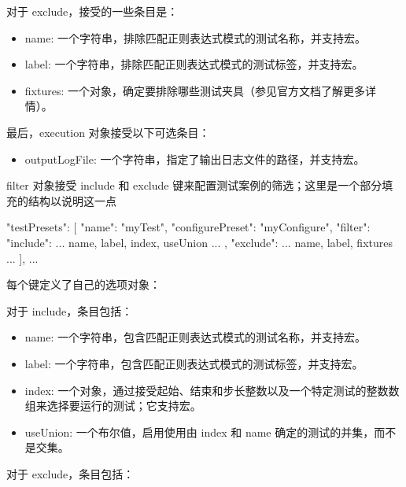 对于 exclude，接受的一些条目是：

\begin{itemize}
\item
name: 一个字符串，排除匹配正则表达式模式的测试名称，并支持宏。

\item
label:  一个字符串，排除匹配正则表达式模式的测试标签，并支持宏。

\item
fixtures: 一个对象，确定要排除哪些测试夹具（参见官方文档了解更多详情）。
\end{itemize}

最后，execution 对象接受以下可选条目：

\begin{itemize}
\item
outputLogFile: 一个字符串，指定了输出日志文件的路径，并支持宏。
\end{itemize}

filter 对象接受 include 和 exclude 键来配置测试案例的筛选；这里是一个部分填充的结构以说明这一点

\begin{json}
    "testPresets": [
        {
            "name": "myTest",
            "configurePreset": "myConfigure",
            "filter": {
                "include": {
                    ... name, label, index, useUnion ...
                },
                "exclude": {
                    ... name, label, fixtures ...
                }
            }
        }
    ],
...
\end{json}

每个键定义了自己的选项对象：

对于 include，条目包括：

\begin{itemize}
\item
name:  一个字符串，包含匹配正则表达式模式的测试名称，并支持宏。

\item
label: 一个字符串，包含匹配正则表达式模式的测试标签，并支持宏。

\item
index: 一个对象，通过接受起始、结束和步长整数以及一个特定测试的整数数组来选择要运行的测试；它支持宏。

\item
useUnion: 一个布尔值，启用使用由 index 和 name 确定的测试的并集，而不是交集。
\end{itemize}

对于 exclude，条目包括：

